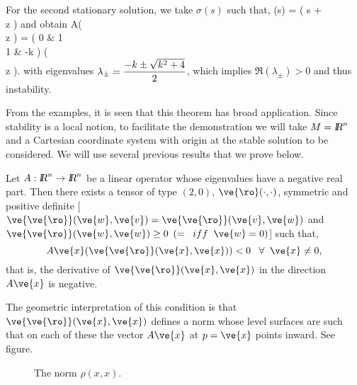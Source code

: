 For the second stationary solution, we take $\sigma(s)$ such that,
\beq 
 \phi \circ \sigma(s) = \left(  \delta \theta s + \pi \\ \delta z 
\earr \right)
\eeq 
and obtain
\beq
 A\left(  \delta \theta \\ 
                 \delta z 
           \earr \right) = \left(  0 & 1 \\ 
                                          1 & -k 
                           \earr \right)  
                           \left(  \delta \theta \\ \delta z 
                           \earr \right). 
\eeq
with eigenvalues $\lambda_{\pm} = \displaystyle\frac{-k \pm \sqrt{k^2 + 4}}{2}$, which implies $\Re (\lambda_{\pm}) > 0$ and thus instability.

From the examples, it is seen that this theorem has broad application. Since stability is a local notion, to facilitate the demonstration we will take $M = \mbox{\sl {l$\!\!\!\;\:\!$R}}^n$ and a Cartesian coordinate system with origin at the stable solution to be considered. We will use several previous results that we prove below.

\bteo[Lyapunov] 
Let $A:\re^n \rightarrow \re^n$ be a linear operator whose eigenvalues have a negative real part. Then there exists a tensor of type $(2,0)$, $\ve{\ro}(\cdot,\cdot)$, symmetric and positive definite [$\ve{\ve{\ro}}(\ve{w},\ve{v}) = \ve{\ve{\ro}} (\ve{v},\ve{w})$ and $\ve{\ve{\ro}}(\ve{w},\ve{w}) \geq 0$ $(=\;\; iff\;\; \ve{w}=0)$] such that,
$$
A\ve{x}(\ve{\ve{\ro}}(\ve{x},\ve{x})) < 0 \;\;\;\forall \;\;\ve{x} \neq 0,
$$
that is, the derivative of $\ve{\ve{\ro}}(\ve{x},\ve{x}) $ in the direction $A\ve{x}$ is negative.
\eteo

The geometric interpretation of this condition is that $\ve{\ve{\ro}}(\ve{x},\ve{x})$ defines a norm whose level surfaces are such that on each of these the vector $A\ve{x}$ at $p=\ve{x}$ points inward. See figure.

\espa 
\begin{figure}[htbp]
  \begin{center}
    \caption{The norm $\rho(x,x)$.}
    \label{fig:6_3}
  \end{center}
\end{figure}

